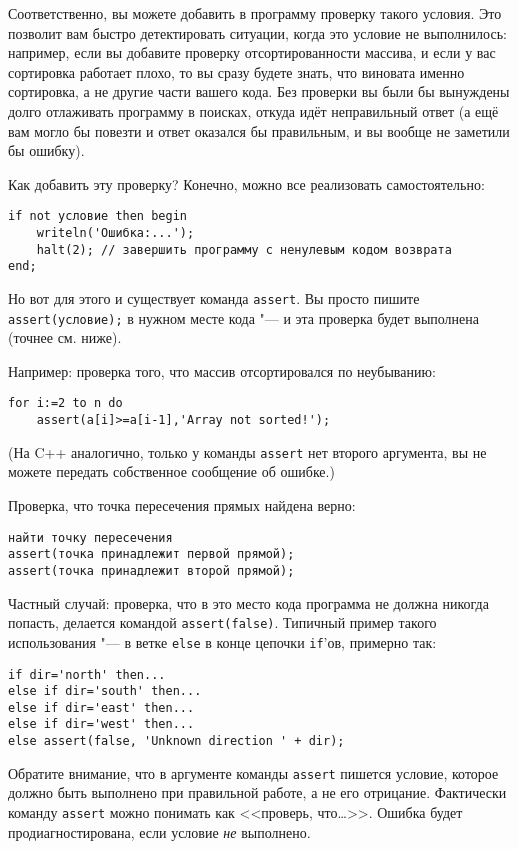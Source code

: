 Соответственно, вы можете добавить в программу проверку такого условия. 
Это позволит вам быстро детектировать ситуации, когда это условие не выполнилось: например, если вы добавите проверку отсортированности массива,
и если у вас сортировка работает плохо, то вы сразу будете знать, что виновата именно сортировка, а не другие части вашего кода.
Без проверки вы были бы вынуждены долго отлаживать программу в поисках, откуда идёт неправильный ответ (а ещё вам могло бы повезти и ответ оказался бы правильным,
и вы вообще не заметили бы ошибку).

Как добавить эту проверку? Конечно, можно все реализовать самостоятельно:
\begin{verbatim}
if not условие then begin 
    writeln('Ошибка:...');
    halt(2); // завершить программу с ненулевым кодом возврата
end;
\end{verbatim}
Но вот для этого и существует команда \verb`assert`. 
Вы просто пишите \verb`assert(условие);` в нужном месте кода "--- и эта проверка будет выполнена (точнее см. ниже).

Например: проверка того, что массив отсортировался по неубыванию:
\begin{verbatim}
for i:=2 to n do
    assert(a[i]>=a[i-1],'Array not sorted!');
\end{verbatim}
(На C++ аналогично, только у команды \verb`assert` нет второго аргумента, вы не можете передать собственное сообщение об ошибке.)

Проверка, что точка пересечения прямых найдена верно:
\begin{verbatim}
найти точку пересечения
assert(точка принадлежит первой прямой);
assert(точка принадлежит второй прямой);
\end{verbatim}

Частный случай: проверка, что в это место кода программа не должна никогда попасть, делается командой \verb`assert(false)`. 
Типичный пример такого использования "--- в ветке \verb`else` в конце цепочки \verb`if`'ов, примерно так:
\begin{verbatim}
if dir='north' then...
else if dir='south' then...
else if dir='east' then...
else if dir='west' then...
else assert(false, 'Unknown direction ' + dir);
\end{verbatim}

Обратите внимание, что в аргументе команды \verb`assert` пишется условие, которое должно быть выполнено при правильной работе, а не его отрицание. 
Фактически команду \verb`assert` можно понимать как <<проверь, что\dots>>. Ошибка будет продиагностирована, если условие \textit{не} выполнено.

